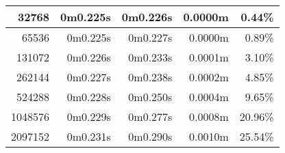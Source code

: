 \documentclass[documentation.tex]{subfiles}
\begin{document}
\begin{longtable}{|r|r|r|r|r|}
        32768                                                                                                                     & 0m0.225s                        & 0m0.226s                                                                    & {\color[HTML]{32CB00} 0.0000m}                    & {\color[HTML]{32CB00} 0.44\%}                     \\ \hline
        65536                                                                                                                     & 0m0.225s                        & 0m0.227s                                                                    & {\color[HTML]{32CB00} 0.0000m}                    & {\color[HTML]{32CB00} 0.89\%}                     \\ \hline
        131072                                                                                                                    & 0m0.226s                        & 0m0.233s                                                                    & {\color[HTML]{32CB00} 0.0001m}                    & {\color[HTML]{32CB00} 3.10\%}                     \\ \hline
        262144                                                                                                                    & 0m0.227s                        & 0m0.238s                                                                    & {\color[HTML]{32CB00} 0.0002m}                    & {\color[HTML]{32CB00} 4.85\%}                     \\ \hline
        524288                                                                                                                    & 0m0.228s                        & 0m0.250s                                                                    & {\color[HTML]{32CB00} 0.0004m}                    & {\color[HTML]{32CB00} 9.65\%}                     \\ \hline
        1048576                                                                                                                   & 0m0.229s                        & 0m0.277s                                                                    & {\color[HTML]{32CB00} 0.0008m}                    & {\color[HTML]{32CB00} 20.96\%}                    \\ \hline
        2097152                                                                                                                   & 0m0.231s                        & 0m0.290s                                                                    & {\color[HTML]{32CB00} 0.0010m}                    & {\color[HTML]{32CB00} 25.54\%}                    \\ \hline

\end{longtable}
\end{document}
